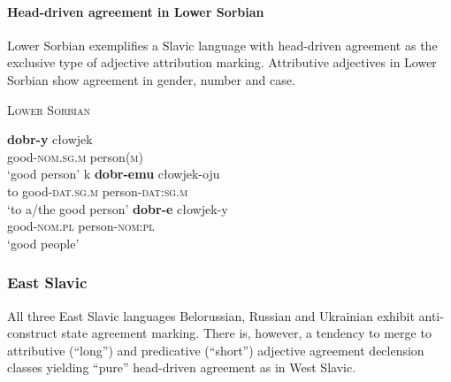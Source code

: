 \paragraph{Head-driven agreement in Lower Sorbian}
Lower Sorbian exemplifies a Slavic language with head-driven agreement as the exclusive type of adjective attribution marking. Attributive adjectives in Lower Sorbian show agreement in gender, number and case. 
\begin{exe}
\ex \textsc{Lower Sorbian} \citep{janas1976}
\begin{xlist}
\ex
\gll	\textbf{dobr-y} cłowjek\\
	good-\textsc{nom.sg.m} person(\textsc{m})\\
\glt	‘good person’
\ex
\gll	k \textbf{dobr-emu} cłowjek-oju\\
	to good-\textsc{dat.sg.m} person-\textsc{dat:sg.m}\\
\glt	‘to a/the good person’
\ex
\gll	\textbf{dobr-e} cłowjek-y\\
	good-\textsc{nom.pl} person-\textsc{nom:pl}\\
\glt	‘good people’
\end{xlist}
\end{exe}

\subsubsection{East Slavic}
All three East Slavic languages Belorussian, Russian and Ukrainian exhibit anti-construct state agreement marking. There is, however, a tendency to merge to attributive (“long”) and predicative (“short”) adjective agreement declension classes yielding “pure” head-driven agreement as in West Slavic.

